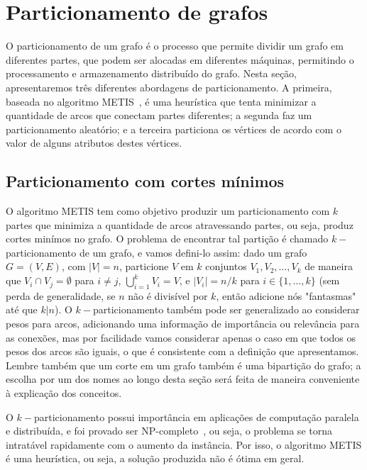 \documentclass[conference]{IEEEtran}
\begin{document}
\section{Particionamento de grafos}
O particionamento de um grafo é o processo que permite dividir um grafo
em diferentes partes, que podem ser alocadas em diferentes máquinas,
permitindo o processamento e armazenamento distribuído do grafo. Nesta
seção, apresentaremos três diferentes abordagens de particionamento.
A primeira, baseada no algoritmo METIS~\cite{metis}, é uma heurística
que tenta minimizar a quantidade de arcos que conectam partes
diferentes; a segunda faz um particionamento aleatório; e a terceira
particiona os vértices de acordo com o valor de alguns atributos destes
vértices.

\subsection{Particionamento com cortes mínimos}
O algoritmo METIS tem como objetivo produzir um particionamento com
$k$ partes que minimiza a quantidade de arcos atravessando partes, ou
seja, produz cortes minímos no grafo. O problema de encontrar tal
partição é chamado $k-$particionamento de um grafo, e vamos defini-lo
assim: dado um grafo $G = (V, E)$, com $|V| = n$, particione $V$ em $k$
conjuntos $V_1, V_2, \ldots, V_k$ de maneira que
$V_i \cap V_j = \emptyset$ para $i \neq j$, $\bigcup_{i = 1}^k V_i = V$,
e $|V_i| = n / k$ para $i \in \{1, \ldots, k\}$ (sem perda de
generalidade, se $n$ não é divisível por $k$, então adicione nós
"fantasmas" até que $k | n$). O $k-$particionamento também pode ser
generalizado ao considerar pesos para arcos, adicionando uma informação
de importância ou relevância para as conexões, mas por facilidade vamos
considerar apenas o caso em que todos os pesos dos arcos são iguais, o
que é consistente com a definição que apresentamos. Lembre também que
um corte em um grafo também é uma bipartição do grafo; a escolha por um
dos nomes ao longo desta seção será feita de maneira conveniente à
explicação dos conceitos.

O $k-$particionamento possui importância em aplicações de computação
paralela e distribuída, e foi provado ser
NP-completo~\cite{graphpartitioning}, ou seja, o problema se torna
intratável rapidamente com o aumento da instância. Por isso, o algoritmo
METIS é uma heurística, ou seja, a solução produzida não é ótima em
geral.
\end{document}
